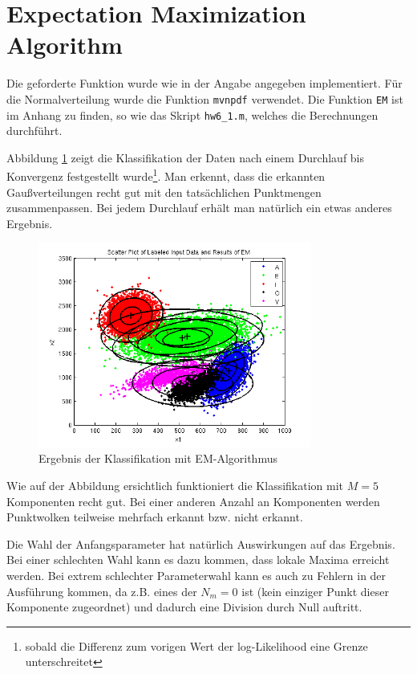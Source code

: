 \section{Expectation Maximization Algorithm}

Die geforderte Funktion wurde wie in der Angabe angegeben implementiert. Für die Normalverteilung wurde die Funktion \texttt{mvnpdf} verwendet. Die Funktion \texttt{EM} ist im Anhang zu finden, so wie das Skript \texttt{hw6_1.m}, welches die Berechnungen durchführt.

Abbildung \ref{fig:6_1_EM_classification} zeigt die Klassifikation der Daten nach einem Durchlauf bis Konvergenz festgestellt wurde\footnote{sobald die Differenz zum vorigen Wert der log-Likelihood eine Grenze unterschreitet}. Man erkennt, dass die erkannten Gaußverteilungen recht gut mit den tatsächlichen Punktmengen zusammenpassen. Bei jedem Durchlauf erhält man natürlich ein etwas anderes Ergebnis.

\begin{figure}[h!]
  \centering
	\includegraphics[width=0.8\textwidth]{./figures/6_1_EM_classification.png}
	\caption{Ergebnis der Klassifikation mit EM-Algorithmus}
	\label{fig:6_1_EM_classification}
\end{figure}

Wie auf der Abbildung ersichtlich funktioniert die Klassifikation mit $M=5$ Komponenten recht gut. Bei einer anderen Anzahl an Komponenten werden Punktwolken teilweise mehrfach erkannt bzw. nicht erkannt.

Die Wahl der Anfangsparameter hat natürlich Auswirkungen auf das Ergebnis. Bei einer schlechten Wahl kann es dazu kommen, dass lokale Maxima erreicht werden. Bei extrem schlechter Parameterwahl kann es auch zu Fehlern in der Ausführung kommen, da z.B. eines der $N_m = 0$ ist (kein einziger Punkt dieser Komponente zugeordnet) und dadurch eine Division durch Null auftritt.

